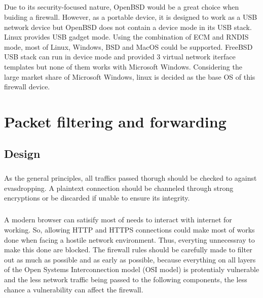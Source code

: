 \documentclass[mscthesis]{usiinfthesis}
\begin{document}
\paragraph{}
Due to its security-focused nature, OpenBSD would be a great choice when buiding a firewall. However, as a portable device, it is designed to work as a USB network device but OpenBSD does not contain a device mode in its USB stack. Linux provides USB gadget mode. Using the combination of ECM and RNDIS mode, most of Linux, Windows, BSD and MacOS could be supported. FreeBSD USB stack can run in device mode and provided 3 virtual network iterface templates but none of them works with Microsoft Windows\citep{freebsdhb:usb}. Considering the large market share of Microsoft Windows, linux is decided as the base OS of this firewall device.

\chapter{Packet filtering and forwarding}
\section{Design}
\paragraph{}
As the general principles, all traffics passed thorugh should be checked to against evasdropping. A plaintext connection should be channeled through strong encryptions or be discarded if unable to ensure its integrity.
\paragraph{}
A modern browser can satisify most of needs to interact with internet for working. So, allowing HTTP and HTTPS connections could make most of works done when facing a hostile network environment. Thus, everyting unnecessray to make this done are blocked. The firewall rules should be carefully made to filter out as much as possible and as early as possible, because everything on all layers of the Open Systems Interconnection model (OSI model) is protentialy vulnerable and the less network traffic being passed to the following components, the less chance a vulnerability can affect the firewall.
\end{document}
